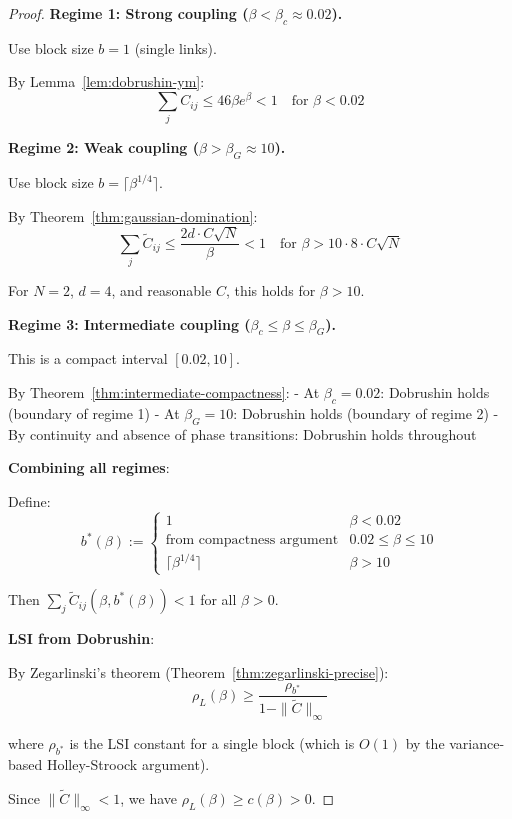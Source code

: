 \begin{proof}
\textbf{Regime 1: Strong coupling ($\beta < \beta_c \approx 0.02$).}

Use block size $b = 1$ (single links).

By Lemma~\ref{lem:dobrushin-ym}:
\[
\sum_j C_{ij} \leq 46\beta e^\beta < 1 \quad \text{for } \beta < 0.02
\]

\textbf{Regime 2: Weak coupling ($\beta > \beta_G \approx 10$).}

Use block size $b = \lceil \beta^{1/4} \rceil$.

By Theorem~\ref{thm:gaussian-domination}:
\[
\sum_j \tilde{C}_{ij} \leq \frac{2d \cdot C\sqrt{N}}{\beta} < 1 \quad \text{for } \beta > 10 \cdot 8 \cdot C\sqrt{N}
\]

For $N = 2$, $d = 4$, and reasonable $C$, this holds for $\beta > 10$.

\textbf{Regime 3: Intermediate coupling ($\beta_c \leq \beta \leq \beta_G$).}

This is a compact interval $[0.02, 10]$.

By Theorem~\ref{thm:intermediate-compactness}:
- At $\beta_c = 0.02$: Dobrushin holds (boundary of regime 1)
- At $\beta_G = 10$: Dobrushin holds (boundary of regime 2)
- By continuity and absence of phase transitions: Dobrushin holds throughout

\textbf{Combining all regimes}:

Define:
\[
b^*(\beta) := \begin{cases}
1 & \beta < 0.02 \\
\text{from compactness argument} & 0.02 \leq \beta \leq 10 \\
\lceil \beta^{1/4} \rceil & \beta > 10
\end{cases}
\]

Then $\sum_j \tilde{C}_{ij}(\beta, b^*(\beta)) < 1$ for all $\beta > 0$.

\textbf{LSI from Dobrushin}:

By Zegarlinski's theorem (Theorem~\ref{thm:zegarlinski-precise}):
\[
\rho_L(\beta) \geq \frac{\rho_{b^*}}{1 - \|\tilde{C}\|_\infty}
\]

where $\rho_{b^*}$ is the LSI constant for a single block (which is $O(1)$ by 
the variance-based Holley-Stroock argument).

Since $\|\tilde{C}\|_\infty < 1$, we have $\rho_L(\beta) \geq c(\beta) > 0$.
\end{proof}

